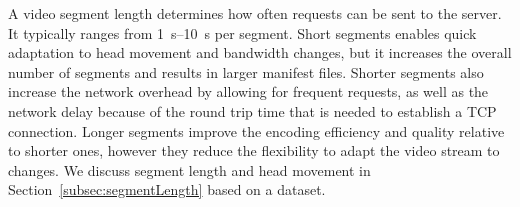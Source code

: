  A video segment length determines how
often requests can be sent to the server. It typically ranges from \SIrange{1}{10}{\second} per segment. Short segments enables quick
adaptation to head movement and bandwidth changes, but it increases
the overall number of segments and results in larger manifest files.
Shorter segments also increase the network overhead by allowing for
frequent requests, as well as the network delay because of the round
trip time that is needed to establish a TCP connection.
Longer segments improve the encoding efficiency and quality relative to
shorter ones, however they reduce the flexibility to adapt the video
stream to changes. We discuss segment length and head movement in
Section~\ref{subsec:segmentLength} based on a dataset.



